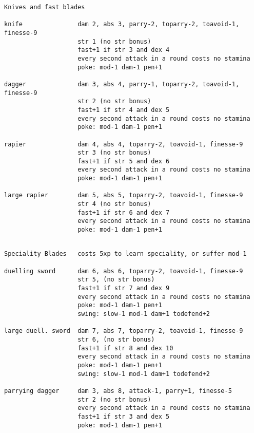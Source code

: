 \begin{verbatim}
\end{verbatim} \goodbreak \begin{verbatim}
Knives and fast blades

knife               dam 2, abs 3, parry-2, toparry-2, toavoid-1, finesse-9
                    str 1 (no str bonus)
                    fast+1 if str 3 and dex 4
                    every second attack in a round costs no stamina
                    poke: mod-1 dam-1 pen+1

dagger              dam 3, abs 4, parry-1, toparry-2, toavoid-1, finesse-9
                    str 2 (no str bonus)
                    fast+1 if str 4 and dex 5
                    every second attack in a round costs no stamina
                    poke: mod-1 dam-1 pen+1

rapier              dam 4, abs 4, toparry-2, toavoid-1, finesse-9
                    str 3 (no str bonus)
                    fast+1 if str 5 and dex 6
                    every second attack in a round costs no stamina
                    poke: mod-1 dam-1 pen+1

large rapier        dam 5, abs 5, toparry-2, toavoid-1, finesse-9
                    str 4 (no str bonus)
                    fast+1 if str 6 and dex 7
                    every second attack in a round costs no stamina
                    poke: mod-1 dam-1 pen+1


\end{verbatim} \goodbreak \begin{verbatim}
Speciality Blades   costs 5xp to learn speciality, or suffer mod-1

duelling sword      dam 6, abs 6, toparry-2, toavoid-1, finesse-9
                    str 5, (no str bonus)
                    fast+1 if str 7 and dex 9
                    every second attack in a round costs no stamina
                    poke: mod-1 dam-1 pen+1
                    swing: slow-1 mod-1 dam+1 todefend+2

large duell. sword  dam 7, abs 7, toparry-2, toavoid-1, finesse-9
                    str 6, (no str bonus)
                    fast+1 if str 8 and dex 10
                    every second attack in a round costs no stamina
                    poke: mod-1 dam-1 pen+1
                    swing: slow-1 mod-1 dam+1 todefend+2

parrying dagger     dam 3, abs 8, attack-1, parry+1, finesse-5
                    str 2 (no str bonus)
                    every second attack in a round costs no stamina
                    fast+1 if str 3 and dex 5
                    poke: mod-1 dam-1 pen+1


\end{verbatim}
